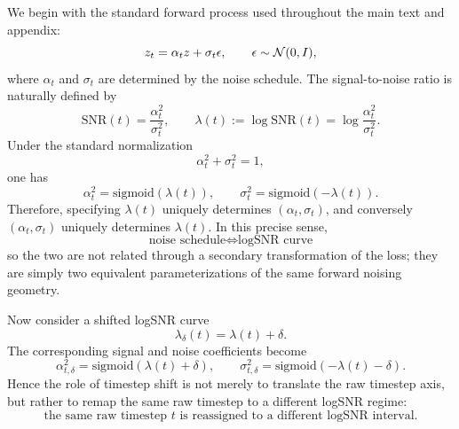 We begin with the standard forward process used throughout the main text and appendix:
\begin{equation}
z_t=\alpha_t z+\sigma_t \epsilon,
\qquad
\epsilon\sim \mathcal{N}(0,I),
\label{eq:app_ns_forward_process}
\end{equation}
where $\alpha_t$ and $\sigma_t$ are determined by the noise schedule. The signal-to-noise ratio is naturally defined by
\begin{equation}
\mathrm{SNR}(t)=\frac{\alpha_t^2}{\sigma_t^2},
\qquad
\lambda(t):=\log \mathrm{SNR}(t)=\log \frac{\alpha_t^2}{\sigma_t^2}.
\label{eq:app_logsnr_def}
\end{equation}
Under the standard normalization
\begin{equation}
\alpha_t^2+\sigma_t^2=1,
\label{eq:app_snr_normalization}
\end{equation}
one has
\begin{equation}
\alpha_t^2=\mathrm{sigmoid}(\lambda(t)),
\qquad
\sigma_t^2=\mathrm{sigmoid}(-\lambda(t)).
\label{eq:app_alpha_sigma_from_logsnr}
\end{equation}
Therefore, specifying $\lambda(t)$ uniquely determines $(\alpha_t,\sigma_t)$, and conversely $(\alpha_t,\sigma_t)$ uniquely determines $\lambda(t)$. In this precise sense,
\begin{equation}
\boxed{
\text{noise schedule}
\Longleftrightarrow
\text{logSNR curve}
}
\label{eq:app_schedule_logsnr_equiv}
\end{equation}
so the two are not related through a secondary transformation of the loss; they are simply two equivalent parameterizations of the same forward noising geometry.

Now consider a shifted logSNR curve
\begin{equation}
\lambda_{\delta}(t)=\lambda(t)+\delta.
\label{eq:app_shifted_logsnr}
\end{equation}
The corresponding signal and noise coefficients become
\begin{equation}
\alpha_{t,\delta}^2=\mathrm{sigmoid}(\lambda(t)+\delta),
\qquad
\sigma_{t,\delta}^2=\mathrm{sigmoid}(-\lambda(t)-\delta).
\label{eq:app_shifted_alpha_sigma}
\end{equation}
Hence the role of timestep shift is not merely to translate the raw timestep axis, but rather to remap the same raw timestep to a different logSNR regime:
\begin{equation}
\boxed{
\text{the same raw timestep } t
\text{ is reassigned to a different logSNR interval.}
}
\label{eq:app_shift_meaning}
\end{equation}

